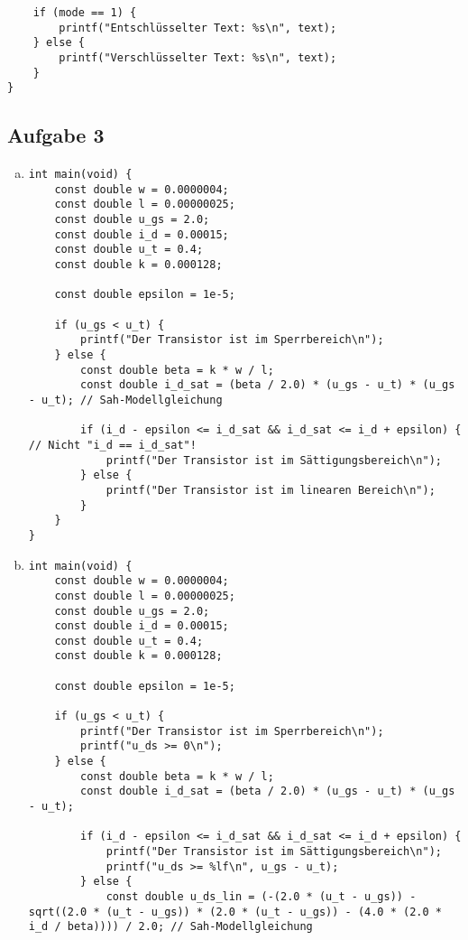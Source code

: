 \documentclass{standalone}
\begin{document}
\begin{enumerate}[a)]
\begin{verbatim}
    if (mode == 1) {
        printf("Entschlüsselter Text: %s\n", text);
    } else {
        printf("Verschlüsselter Text: %s\n", text);
    }
}
    \end{verbatim}

\end{enumerate}
\subsection{Aufgabe 3}
\begin{enumerate}[a)]
\item
    \begin{verbatim}
int main(void) {
    const double w = 0.0000004;
    const double l = 0.00000025;
    const double u_gs = 2.0;
    const double i_d = 0.00015;
    const double u_t = 0.4;
    const double k = 0.000128;

    const double epsilon = 1e-5;

    if (u_gs < u_t) {
        printf("Der Transistor ist im Sperrbereich\n");
    } else {
        const double beta = k * w / l;
        const double i_d_sat = (beta / 2.0) * (u_gs - u_t) * (u_gs - u_t); // Sah-Modellgleichung

        if (i_d - epsilon <= i_d_sat && i_d_sat <= i_d + epsilon) { // Nicht "i_d == i_d_sat"!
            printf("Der Transistor ist im Sättigungsbereich\n");
        } else {
            printf("Der Transistor ist im linearen Bereich\n");
        }
    }
}
    \end{verbatim}

\item
    \begin{verbatim}
int main(void) {
    const double w = 0.0000004;
    const double l = 0.00000025;
    const double u_gs = 2.0;
    const double i_d = 0.00015;
    const double u_t = 0.4;
    const double k = 0.000128;

    const double epsilon = 1e-5;

    if (u_gs < u_t) {
        printf("Der Transistor ist im Sperrbereich\n");
        printf("u_ds >= 0\n");
    } else {
        const double beta = k * w / l;
        const double i_d_sat = (beta / 2.0) * (u_gs - u_t) * (u_gs - u_t);

        if (i_d - epsilon <= i_d_sat && i_d_sat <= i_d + epsilon) {
            printf("Der Transistor ist im Sättigungsbereich\n");
            printf("u_ds >= %lf\n", u_gs - u_t);
        } else {
            const double u_ds_lin = (-(2.0 * (u_t - u_gs)) - sqrt((2.0 * (u_t - u_gs)) * (2.0 * (u_t - u_gs)) - (4.0 * (2.0 * i_d / beta)))) / 2.0; // Sah-Modellgleichung


\end{verbatim}
\end{enumerate}
\end{document}
